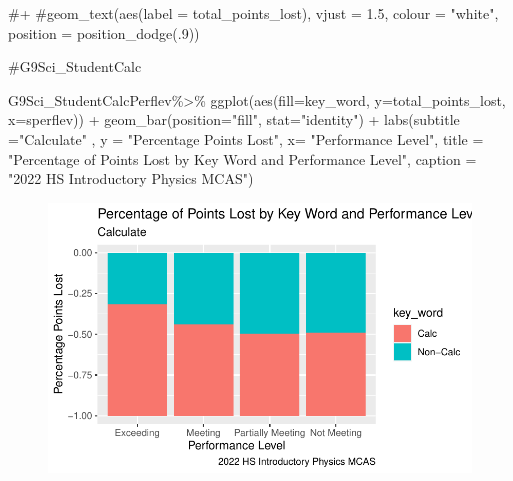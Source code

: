 \documentclass[
  letterpaper,
  DIV=11,
  numbers=noendperiod]{scrartcl}
\newenvironment{Shaded}{\begin{snugshade}}{\end{snugshade}}
\newcommand{\AttributeTok}[1]{\textcolor[rgb]{0.40,0.45,0.13}{#1}}
\newcommand{\CommentTok}[1]{\textcolor[rgb]{0.37,0.37,0.37}{#1}}
\newcommand{\FunctionTok}[1]{\textcolor[rgb]{0.28,0.35,0.67}{#1}}
\newcommand{\NormalTok}[1]{\textcolor[rgb]{0.00,0.23,0.31}{#1}}
\newcommand{\SpecialCharTok}[1]{\textcolor[rgb]{0.37,0.37,0.37}{#1}}
\newcommand{\StringTok}[1]{\textcolor[rgb]{0.13,0.47,0.30}{#1}}
\begin{document}
\begin{Shaded}
\begin{Highlighting}[]
\CommentTok{\#+}
   \CommentTok{\#geom\_text(aes(label = \textasciigrave{}total\_points\_lost\textasciigrave{}), vjust = 1.5, colour = "white", position = position\_dodge(.9))}

\CommentTok{\#G9Sci\_StudentCalc}




\NormalTok{G9Sci\_StudentCalcPerflev}\SpecialCharTok{\%\textgreater{}\%}
 \FunctionTok{ggplot}\NormalTok{(}\FunctionTok{aes}\NormalTok{(}\AttributeTok{fill=}\StringTok{\textasciigrave{}}\AttributeTok{key\_word}\StringTok{\textasciigrave{}}\NormalTok{, }\AttributeTok{y=}\NormalTok{total\_points\_lost, }\AttributeTok{x=}\StringTok{\textasciigrave{}}\AttributeTok{sperflev}\StringTok{\textasciigrave{}}\NormalTok{)) }\SpecialCharTok{+} \FunctionTok{geom\_bar}\NormalTok{(}\AttributeTok{position=}\StringTok{"fill"}\NormalTok{, }\AttributeTok{stat=}\StringTok{"identity"}\NormalTok{) }\SpecialCharTok{+}
   \FunctionTok{labs}\NormalTok{(}\AttributeTok{subtitle =}\StringTok{"Calculate"}\NormalTok{ ,}
       \AttributeTok{y =} \StringTok{"Percentage Points Lost"}\NormalTok{,}
       \AttributeTok{x=} \StringTok{"Performance Level"}\NormalTok{,}
       \AttributeTok{title =} \StringTok{"Percentage of Points Lost by Key Word and Performance Level"}\NormalTok{,}
      \AttributeTok{caption =} \StringTok{"2022 HS Introductory Physics MCAS"}\NormalTok{)}
\end{Highlighting}
\end{Shaded}

\begin{figure}[H]

{\centering \includegraphics{theresaSzczepanski_final_files/figure-pdf/unnamed-chunk-26-1.pdf}

}

\end{figure}
\end{document}
